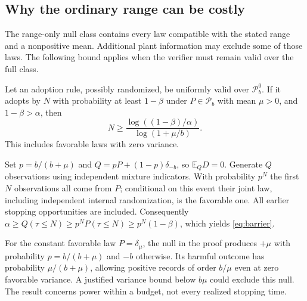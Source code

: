 \documentclass[twocolumn,nameyear]{autart}
\begin{document}
\subsection{Why the ordinary range can be costly}
The range-only null class contains every law compatible with the stated
range and a nonpositive mean. Additional plant information may exclude
some of those laws. The following bound applies when the verifier must
remain valid over the full class.

\begin{prop}\label{prop:barrier}
Let an adoption rule, possibly randomized, be uniformly valid over
$\mathcal P_b^0$. If it adopts by $N$ with probability at least $1-\beta$
under $P\in\mathcal P_b$ with mean $\mu>0$, and $1-\beta>\alpha$, then
\begin{equation}\label{eq:barrier}
 N\ge\frac{\log((1-\beta)/\alpha)}{\log(1+\mu/b)}.
\end{equation}
This includes favorable laws with zero variance.
\end{prop}
\begin{pf}
Set $p=b/(b+\mu)$ and $Q=pP+(1-p)\delta_{-b}$, so $\mathbb{E}_QD=0$.
Generate $Q$ observations using independent mixture indicators. With
probability $p^N$ the first $N$ observations all come from $P$; conditional
on this event their joint law, including independent internal
randomization, is the favorable one. All earlier stopping opportunities
are included. Consequently
$\alpha\ge Q(\tau\le N)\ge p^N P(\tau\le N)\ge p^N(1-\beta)$,
which yields \eqref{eq:barrier}.
\end{pf}

For the constant favorable law $P=\delta_\mu$, the null in the proof
produces $+\mu$ with probability $p=b/(b+\mu)$ and $-b$ otherwise.
Its harmful outcome has probability $\mu/(b+\mu)$, allowing positive
records of order $b/\mu$ even at zero favorable variance.
A justified variance bound below $b\mu$ could exclude this null.
The result concerns power within a budget, not every realized stopping time.
\end{document}
